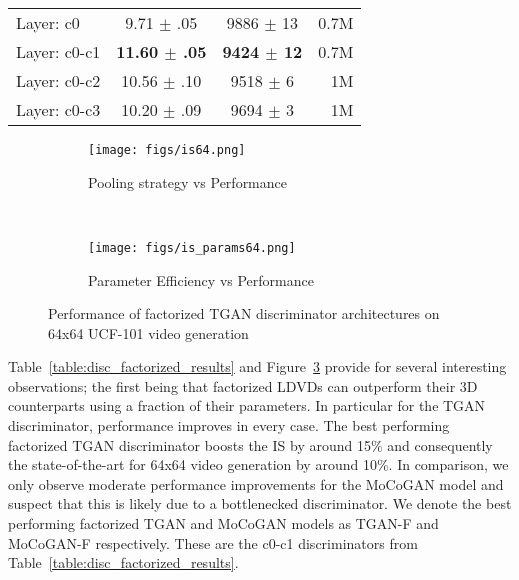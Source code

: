 \documentclass[a4paper,fleqn]{cas-sc}
\begin{document}
\begin{table}[width=\linewidth,cols=8,pos=!h]
\begin{subtable}{.5\linewidth}
\begin{tabular*}{0.98\linewidth}{@{} lccr@{}}
    \hline
    Layer: c0                                 &  9.71 $\pm$ .05  &        9886 $\pm$ 13           &       0.7M              \\
Layer: c0-c1                              &  \textbf{11.60 $\pm$ .05}  &       \textbf{9424 $\pm$ 12}           &       0.7M              \\
Layer: c0-c2                              &  10.56 $\pm$ .10  &       9518 $\pm$ 6            &       1M                \\
Layer: c0-c3            &    10.20 $\pm$ .09  &     9694 $\pm$ 3   &       1M              \\
    \hline \end{tabular*}
\end{subtable}
\end{table}


\begin{figure}[pos=!h]
    \centering
    \begin{subfigure}[t]{0.5\textwidth}
        \centering
        \texttt{[image: figs/is64.png]}
        \caption{Pooling strategy vs Performance}
        \label{fig:isFconv64arch}
    \end{subfigure}~
    \begin{subfigure}[t]{0.5\textwidth}
        \centering
        \texttt{[image: figs/is\_params64.png]}
        \caption{Parameter Efficiency vs Performance}
        \label{fig:isFconv64par}
    \end{subfigure}
    \caption{Performance of factorized TGAN discriminator architectures on 64x64 UCF-101 video generation}\label{fig:tgan_isFconv64}
\end{figure}


Table~\ref{table:disc_factorized_results} and Figure~\ref{fig:tgan_isFconv64} provide for several interesting observations; the first being that factorized LDVDs can outperform their 3D counterparts using a fraction of their parameters. In particular for the TGAN discriminator, performance improves in every case. The best performing factorized TGAN discriminator boosts the IS by around 15\% and consequently the state-of-the-art for 64x64 video generation by around 10\%. In comparison, we only observe moderate performance improvements for the MoCoGAN model and suspect that this is likely due to a bottlenecked discriminator. We denote the best performing factorized TGAN and MoCoGAN models as TGAN-F and MoCoGAN-F respectively. These are the c0-c1 discriminators from Table~\ref{table:disc_factorized_results}. 
\end{document}
